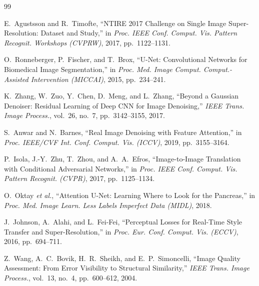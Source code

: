 \documentclass[conference]{IEEEtran}
\newcommand{\etal}{\textit{et al.}}
\begin{document}



















\begin{thebibliography}{99}

E.~Agustsson and R.~Timofte, ``NTIRE 2017 Challenge on Single Image Super-Resolution: Dataset and Study,'' in \textit{Proc. IEEE Conf. Comput. Vis. Pattern Recognit. Workshops (CVPRW)}, 2017, pp.~1122--1131.

O.~Ronneberger, P.~Fischer, and T.~Brox, ``U-Net: Convolutional Networks for Biomedical Image Segmentation,'' in \textit{Proc. Med. Image Comput. Comput.-Assisted Intervention (MICCAI)}, 2015, pp.~234--241.

K.~Zhang, W.~Zuo, Y.~Chen, D.~Meng, and L.~Zhang, ``Beyond a Gaussian Denoiser: Residual Learning of Deep CNN for Image Denoising,'' \textit{IEEE Trans. Image Process.}, vol.~26, no.~7, pp.~3142--3155, 2017.

S.~Anwar and N.~Barnes, ``Real Image Denoising with Feature Attention,'' in \textit{Proc. IEEE/CVF Int. Conf. Comput. Vis. (ICCV)}, 2019, pp.~3155--3164.

P.~Isola, J.-Y.~Zhu, T.~Zhou, and A.~A.~Efros, ``Image-to-Image Translation with Conditional Adversarial Networks,'' in \textit{Proc. IEEE Conf. Comput. Vis. Pattern Recognit. (CVPR)}, 2017, pp.~1125--1134.

O.~Oktay \etal, ``Attention U-Net: Learning Where to Look for the Pancreas,'' in \textit{Proc. Med. Image Learn. Less Labels Imperfect Data (MIDL)}, 2018.

J.~Johnson, A.~Alahi, and L.~Fei-Fei, ``Perceptual Losses for Real-Time Style Transfer and Super-Resolution,'' in \textit{Proc. Eur. Conf. Comput. Vis. (ECCV)}, 2016, pp.~694--711.

Z.~Wang, A.~C.~Bovik, H.~R.~Sheikh, and E.~P.~Simoncelli, ``Image Quality Assessment: From Error Visibility to Structural Similarity,'' \textit{IEEE Trans. Image Process.}, vol.~13, no.~4, pp.~600--612, 2004.


\end{thebibliography}
\end{document}

